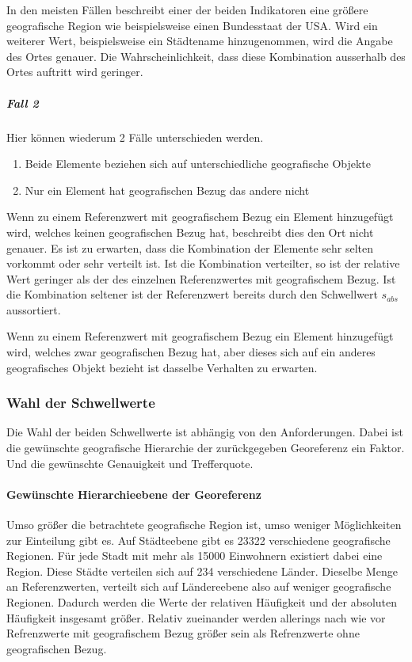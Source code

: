 							In den meisten Fällen beschreibt einer der beiden Indikatoren eine größere geografische Region wie beispielsweise einen Bundesstaat der USA.
							Wird ein weiterer Wert, beispielsweise ein Städtename hinzugenommen, wird die Angabe des Ortes genauer. 
							Die Wahrscheinlichkeit, dass diese Kombination ausserhalb des Ortes auftritt wird geringer. 

					\subparagraph{Fall 2}

						Hier können wiederum 2 Fälle unterschieden werden.

						\begin{enumerate}
							\item Beide Elemente beziehen sich auf unterschiedliche geografische Objekte
							\item Nur ein Element hat geografischen Bezug das andere nicht 
						\end{enumerate}

						Wenn zu einem Referenzwert mit geografischem Bezug ein Element hinzugefügt wird, welches keinen geografischen Bezug hat, beschreibt dies den Ort nicht genauer.
						Es ist zu erwarten, dass die Kombination der Elemente sehr selten vorkommt oder sehr verteilt ist. 
						Ist die Kombination verteilter, so ist der relative Wert geringer als der des einzelnen Referenzwertes mit geografischem Bezug.
						Ist die Kombination seltener ist der Referenzwert bereits durch den Schwellwert $s_{abs}$ aussortiert.		

						Wenn zu einem Referenzwert mit geografischem Bezug ein Element hinzugefügt wird, welches zwar geografischen Bezug hat, aber dieses sich auf ein anderes geografisches Objekt bezieht ist dasselbe Verhalten zu erwarten.
						
			\subsubsection{Wahl der Schwellwerte}

				Die Wahl der beiden Schwellwerte ist abhängig von den Anforderungen.
				Dabei ist die gewünschte geografische Hierarchie der zurückgegeben Georeferenz ein Faktor.
				Und die gewünschte Genauigkeit und Trefferquote.
				
				\paragraph{Gewünschte Hierarchieebene der Georeferenz}

					Umso größer die betrachtete geografische Region ist, umso weniger Möglichkeiten zur Einteilung gibt es.
					Auf Städteebene gibt es 23322 verschiedene geografische Regionen. 
					Für jede Stadt mit mehr als 15000 Einwohnern existiert dabei eine Region.
					Diese Städte verteilen sich auf 234 verschiedene Länder.
					Dieselbe Menge an Referenzwerten, verteilt sich auf Ländereebene also auf weniger geografische Regionen. 
					Dadurch werden die Werte der relativen Häufigkeit und der absoluten Häufigkeit insgesamt größer.
					Relativ zueinander werden allerings nach wie vor Refrenzwerte mit geografischem Bezug größer sein als Refrenzwerte ohne geografischen Bezug.

